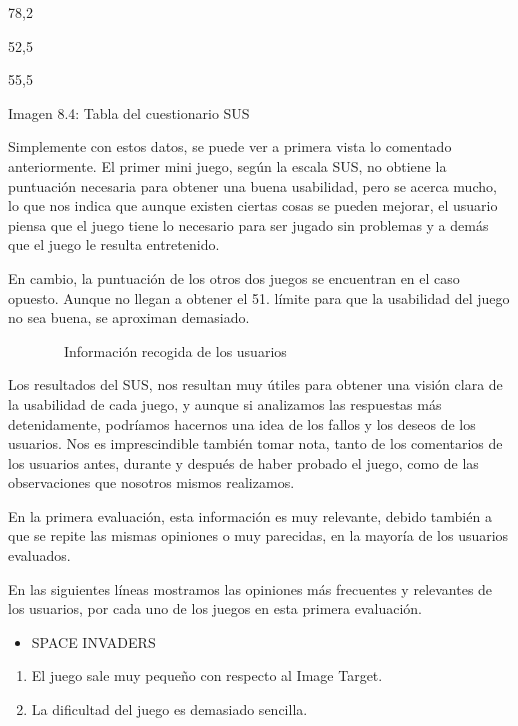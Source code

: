 \documentclass[]{article}
\begin{document}
78,2

52,5

55,5

Imagen 8.4: Tabla del cuestionario SUS

Simplemente con estos datos, se puede ver a primera vista lo comentado
anteriormente. El primer mini juego, según la escala SUS, no obtiene la
puntuación necesaria para obtener una buena usabilidad, pero se acerca
mucho, lo que nos indica que aunque existen ciertas cosas se pueden
mejorar, el usuario piensa que el juego tiene lo necesario para ser
jugado sin problemas y a demás que el juego le resulta entretenido.

En cambio, la puntuación de los otros dos juegos se encuentran en el
caso opuesto. Aunque no llegan a obtener el 51. límite para que la
usabilidad del juego no sea buena, se aproximan demasiado.

~~~~~~~~Información recogida de los usuarios

Los resultados del SUS, nos resultan muy útiles para obtener una visión
clara de la usabilidad de cada juego, y aunque si analizamos las
respuestas más detenidamente, podríamos hacernos una idea de los fallos
y los deseos de los usuarios. Nos es imprescindible también tomar nota,
tanto de los comentarios de los usuarios antes, durante y después de
haber probado el juego, como de las observaciones que nosotros mismos
realizamos.

En la primera evaluación, esta información es muy relevante, debido
también a que se repite las mismas opiniones o muy parecidas, en la
mayoría de los usuarios evaluados.

En las siguientes líneas mostramos las opiniones más frecuentes y
relevantes de los usuarios, por cada uno de los juegos en esta primera
evaluación.

\begin{itemize}
\itemsep1pt\parskip0pt
\item
  SPACE INVADERS
\end{itemize}

\begin{enumerate}
\itemsep1pt\parskip0pt
\item
  El juego sale muy pequeño con respecto al Image Target.
\end{enumerate}

\begin{enumerate}
\setcounter{enumi}{1}
\itemsep1pt\parskip0pt
\item
  La dificultad del juego es demasiado sencilla.
\end{enumerate}
\end{document}
